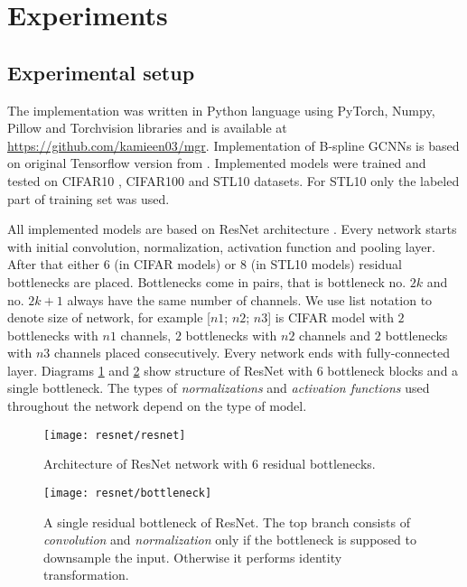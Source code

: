 \section{Experiments}
\subsection{Experimental setup}
The implementation was written in Python language using
PyTorch, Numpy, Pillow and Torchvision libraries
and is available at
\url{https://github.com/kamieen03/mgr}.
Implementation
of B-spline GCNNs is based on original Tensorflow version from
\cite{bekkers2019}.
Implemented models were trained and tested on CIFAR10 \cite{cifar},
CIFAR100 \cite{cifar} and STL10 \cite{stl10} datasets.
For STL10 only the labeled part of training set was used.

All implemented models are based on ResNet architecture \cite{resnet}.
Every network starts with initial convolution, normalization, activation
function and pooling layer. After that either $6$ (in CIFAR models)
or $8$ (in STL10 models) residual bottlenecks are
placed. Bottlenecks come in pairs, that is bottleneck no. $2k$ and no. $2k+1$
always have the same number of channels. We use list notation to denote size of
network, for example [$\mathit{n1}$; $\mathit{n2}$; $\mathit{n3}$]
is CIFAR model with $2$ bottlenecks with $n1$ channels, $2$ bottlenecks with
$n2$ channels and $2$ bottlenecks with $n3$ channels placed consecutively.
Every network ends with fully-connected layer.
Diagrams \ref{fig:resnet} and
\ref{fig:bottleneck}
show structure of ResNet with $6$ bottleneck blocks and a single bottleneck.
The types of \textit{normalizations} and \textit{activation functions}
used throughout the network depend on the type of model.

    \begin{figure}[h!]
        \centering
        \texttt{[image: resnet/resnet]}
        \caption{Architecture of ResNet network with $6$ residual bottlenecks.}
        \label{fig:resnet}
    \end{figure}

    \begin{figure}[h!]
        \centering
        \texttt{[image: resnet/bottleneck]}
        \caption{A single residual bottleneck of ResNet.
            The top branch consists
            of \textit{convolution} and \textit{normalization} only if the bottleneck is
            supposed to downsample the input. Otherwise it performs identity
            transformation.}
        \label{fig:bottleneck}
    \end{figure}

